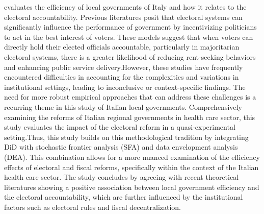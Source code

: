   evaluates the efficiency of local governments of Italy and how it relates to the electoral accountability. Previous literatures posit that electoral systems can significantly influence the performance of government by incentivizing politicians to act in the best interest of voters. These models suggest that when voters can directly hold their elected officials accountable, particularly in majoritarian electoral systems, there is a greater likelihood of reducing rent-seeking behaviors and enhancing public service delivery.However, these studies have frequently encountered difficulties in accounting for the complexities and variations in institutional settings, leading to inconclusive or context-specific findings. The need for more robust empirical approaches that can address these challenges is a recurring theme in this study of Italian local governments. Comprehensively examining the reforms of Italian regional governments in health care sector, this study evaluates the impact of the electoral reform in a quasi-experimental setting.Thus, this study builds on this methodological tradition by integrating DiD with stochastic frontier analysis (SFA) and data envelopment analysis (DEA). This combination allows for a more nuanced examination of the efficiency effects of electoral and fiscal reforms, specifically within the context of the Italian health care sector. The study concludes by agreeing with recent theoretical literatures showing a positive association between local government efficiency and the electoral accountability, which are further influenced by the institutional factors such as electoral rules and fiscal decentralization. \par
